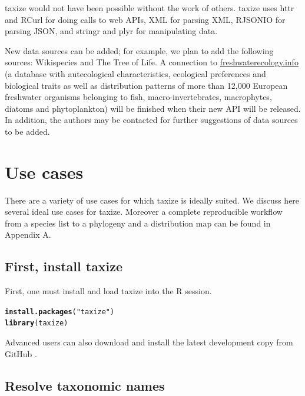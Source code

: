\documentclass[10pt]{article}\usepackage[]{graphicx}\usepackage[]{color}
\makeatletter
\newcommand{\hlfunctioncall}[1]{\textcolor[rgb]{0.501960784313725,0,0.329411764705882}{\textbf{#1}}}%
\newcommand{\hlstring}[1]{\textcolor[rgb]{0.6,0.6,1}{#1}}%
\newenvironment{kframe}{%
 \def\at@end@of@kframe{}%
 \ifinner\ifhmode%
  \def\at@end@of@kframe{\end{minipage}}%
  \begin{minipage}{\columnwidth}%
 \fi\fi%
 \def\FrameCommand##1{\hskip\@totalleftmargin \hskip-\fboxsep
 \colorbox{shadecolor}{##1}\hskip-\fboxsep
     \hskip-\linewidth \hskip-\@totalleftmargin \hskip\columnwidth}%
 \MakeFramed {\advance\hsize-\width
   \@totalleftmargin\z@ \linewidth\hsize
   \@setminipage}}%
 {\par\unskip\endMakeFramed%
 \at@end@of@kframe}
\newenvironment{knitrout}{}{} %
\makeatother
\begin{document}
taxize would not have been possible without the work of others. taxize uses httr \cite{httr} and RCurl \cite{rcurl} for doing calls to web APIs, XML \cite{xml} for parsing XML, RJSONIO \cite{rjsonio} for parsing JSON, and stringr \cite{stringr} and plyr \cite{plyr} for manipulating data.

New data sources can be added; for example, we plan to add the following sources: Wikispecies and The Tree of Life. A connection to \url{freshwaterecology.info} \cite{freshwaterecology} (a database with autecological characteristics, ecological preferences and biological traits as well as distribution patterns of more than 12,000 European freshwater organisms belonging to fish, macro-invertebrates, macrophytes, diatoms and phytoplankton) will be finished when their new API will be released. In addition, the authors may be contacted for further suggestions of data sources to be added.

\section*{Use cases}

There are a variety of use cases for which taxize is ideally suited. We discuss here several ideal use cases for taxize. Moreover a complete reproducible workflow from a species list to a phylogeny and a distribution map can be found in Appendix A.

\subsection*{First, install taxize}

First, one must install and load taxize into the R session.

\begin{knitrout}
\color{fgcolor}\begin{kframe}
\begin{alltt}
\hlfunctioncall{install.packages}(\hlstring{"taxize"})
\hlfunctioncall{library}(taxize)
\end{alltt}
\end{kframe}
\end{knitrout}


Advanced users can also download and install the latest development copy from GitHub \cite{github_taxize}.

\subsection*{Resolve taxonomic names}
\end{document}

